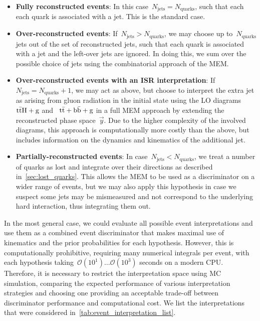 \begin{itemize}
\item \textbf{Fully reconstructed events}: In this case~$N_{\mathrm{jets}} = N_{\mathrm{quarks}}$, such that each each quark is associated with a jet. This is the standard case.
\item \textbf{Over-reconstructed events}: If~$N_{\mathrm{jets}} > N_{\mathrm{quarks}}$, we may choose up to~$N_{\mathrm{quarks}}$ jets out of the set of reconstructed jets, such that each quark is associated with a jet and the left-over jets are ignored. In doing this, we sum over the possible choice of jets using the combinatorial approach of the MEM.
\item \textbf{Over-reconstructed events with an ISR interpretation}: If~$N_{\mathrm{jets}} = N_{\mathrm{quarks}} + 1$, we may act as above, but choose to interpret the extra jet as arising from gluon radiation in the initial state using the LO diagrams~$\mathrm{t} \bar{\mathrm{t}} \mathrm{H} + \mathrm{g}$ and ~$\mathrm{t} \bar{\mathrm{t}} + \mathrm{b}\bar{\mathrm{b}} + \mathrm{g}$ in a full MEM approach by extending the reconstructed phase space~$\vec{y}$. Due to the higher complexity of the involved diagrams, this approach is computationally more costly than the above, but includes information on the dynamics and kinematics of the additional jet.
\item \textbf{Partially-reconstructed events}: In case~$N_{\mathrm{jets}} < N_{\mathrm{quarks}}$, we treat a number of quarks as lost and integrate over their directions as described in~\cref{sec:lost_quarks}. This allows the MEM to be used as a discriminator on a wider range of events, but we may also apply this hypothesis in case we suspect some jets may be mismeasured and not correspond to the underlying hard interaction, thus integrating them out.
\end{itemize}

In the most general case, we could evaluate all possible event interpretations and use them as a combined event discriminator that makes maximal use of kinematics and the prior probabilities for each hypothesis. However, this is computationally prohibitive, requiring many numerical integrals per event, with each hypothesis taking~$\mathcal{O}(10^1)\dots \mathcal{O}(10^3)$ seconds on a modern CPU. Therefore, it is necessary to restrict the interpretation space using MC simulation, comparing the expected performance of various interpretation strategies and choosing one providing an acceptable trade-off between discriminator performance and computational cost. We list the interpretations that were considered in~\cref{tab:event_interpretation_list}.

